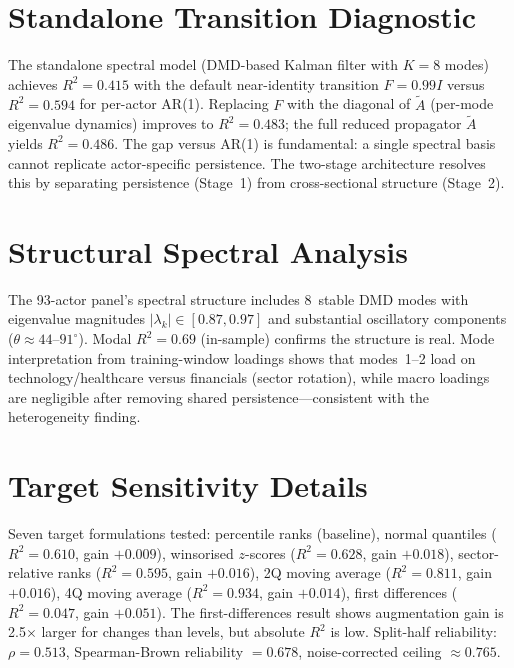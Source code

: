 \documentclass[11pt,a4paper]{article}
\begin{document}
\section{Standalone Transition Diagnostic}
\label{app:standalone}

The standalone spectral model (DMD-based Kalman filter with $K = 8$ modes) achieves $R^2 = 0.415$ with the default near-identity transition $F = 0.99 I$ versus $R^2 = 0.594$ for per-actor AR(1). Replacing $F$ with the diagonal of $\tilde{A}$ (per-mode eigenvalue dynamics) improves to $R^2 = 0.483$; the full reduced propagator $\tilde{A}$ yields $R^2 = 0.486$. The gap versus AR(1) is fundamental: a single spectral basis cannot replicate actor-specific persistence. The two-stage architecture resolves this by separating persistence (Stage~1) from cross-sectional structure (Stage~2).

\section{Structural Spectral Analysis}
\label{app:structural}

The 93-actor panel's spectral structure includes 8~stable DMD modes with eigenvalue magnitudes $|\lambda_k| \in [0.87, 0.97]$ and substantial oscillatory components ($\theta \approx 44$--$91^\circ$). Modal $R^2 = 0.69$ (in-sample) confirms the structure is real. Mode interpretation from training-window loadings shows that modes~1--2 load on technology/healthcare versus financials (sector rotation), while macro loadings are negligible after removing shared persistence---consistent with the heterogeneity finding.

\section{Target Sensitivity Details}
\label{app:target}

Seven target formulations tested: percentile ranks (baseline), normal quantiles ($R^2 = 0.610$, gain $+0.009$), winsorised $z$-scores ($R^2 = 0.628$, gain $+0.018$), sector-relative ranks ($R^2 = 0.595$, gain $+0.016$), 2Q moving average ($R^2 = 0.811$, gain $+0.016$), 4Q moving average ($R^2 = 0.934$, gain $+0.014$), first differences ($R^2 = 0.047$, gain $+0.051$). The first-differences result shows augmentation gain is 2.5$\times$ larger for changes than levels, but absolute $R^2$ is low. Split-half reliability: $\rho = 0.513$, Spearman-Brown reliability $= 0.678$, noise-corrected ceiling $\approx 0.765$.
\end{document}
